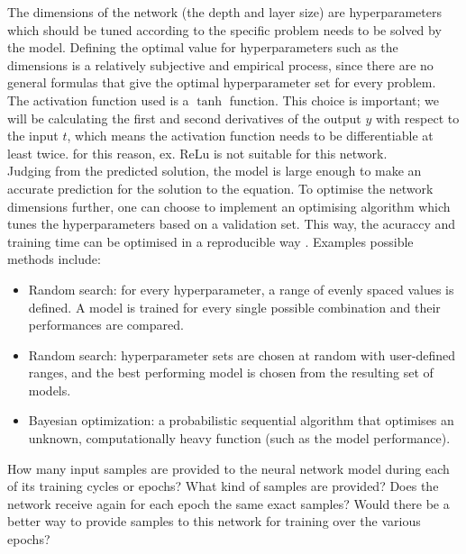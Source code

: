 \documentclass[we,twoside,openright,a4paper,11pt]{uantwerpenbamathesis}
\begin{document}
The dimensions of the network (the depth and layer size) are hyperparameters which should be tuned according to the specific problem needs to be solved by the model. Defining the optimal value for hyperparameters such as the dimensions is a relatively subjective and empirical process, since there are no general formulas that give the optimal hyperparameter set for every problem.\\

The activation function used is a $\tanh$ function. This choice is important; we will be calculating the first and second derivatives of the output $y$ with respect to the input $t$, which means the activation function needs to be differentiable at least twice. for this reason, ex. ReLu is not suitable for this network.\\

Judging from the predicted solution, the model is large enough to make an accurate prediction for the solution to the equation. To optimise the network dimensions further, one can choose to implement an optimising algorithm which tunes the hyperparameters based on a validation set. This way, the acuraccy and training time can be optimised in a reproducible way \cite{geeksforgeeks2026hyperparameter}. Examples possible methods include:
\begin{itemize}
    \item Random search: for every hyperparameter, a range of evenly spaced values is defined. A model is trained for every single possible combination and their performances are compared.
    \item Random search: hyperparameter sets are chosen at random with user-defined ranges, and the best performing model is chosen from the resulting set of models.
    \item Bayesian optimization: a probabilistic sequential algorithm that optimises an unknown, computationally heavy function (such as the model performance).
\end{itemize}


\begin{tcolorbox}[title=Question 5, colback=blue!10!white, colframe=blue!40!white, sharp corners]
    How many input samples are provided to the neural network model during each of its training cycles or epochs? What kind of samples are provided? Does the network receive again for each epoch the same exact samples? Would there be a better way to provide samples to this network for training over the various epochs?
\end{tcolorbox}
\end{document}
